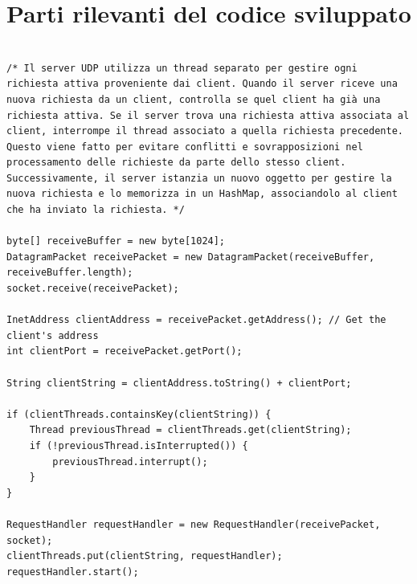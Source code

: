 \documentclass{article}
\begin{document}
\section{Parti rilevanti del codice sviluppato}
\label{sec:Parti rilevanti del codice sviluppato}
\begin{lstlisting}[style=mystyle, caption={ServerUDP}, label={lst:codice}]

/* Il server UDP utilizza un thread separato per gestire ogni richiesta attiva proveniente dai client. Quando il server riceve una nuova richiesta da un client, controlla se quel client ha già una richiesta attiva. Se il server trova una richiesta attiva associata al client, interrompe il thread associato a quella richiesta precedente. Questo viene fatto per evitare conflitti e sovrapposizioni nel processamento delle richieste da parte dello stesso client. Successivamente, il server istanzia un nuovo oggetto per gestire la nuova richiesta e lo memorizza in un HashMap, associandolo al client che ha inviato la richiesta. */

byte[] receiveBuffer = new byte[1024];
DatagramPacket receivePacket = new DatagramPacket(receiveBuffer, receiveBuffer.length);
socket.receive(receivePacket); 

InetAddress clientAddress = receivePacket.getAddress(); // Get the client's address
int clientPort = receivePacket.getPort();

String clientString = clientAddress.toString() + clientPort;

if (clientThreads.containsKey(clientString)) {
    Thread previousThread = clientThreads.get(clientString);
    if (!previousThread.isInterrupted()) {
        previousThread.interrupt();
    }
}

RequestHandler requestHandler = new RequestHandler(receivePacket, socket);
clientThreads.put(clientString, requestHandler);
requestHandler.start();
                
\end{lstlisting}
\end{document}
